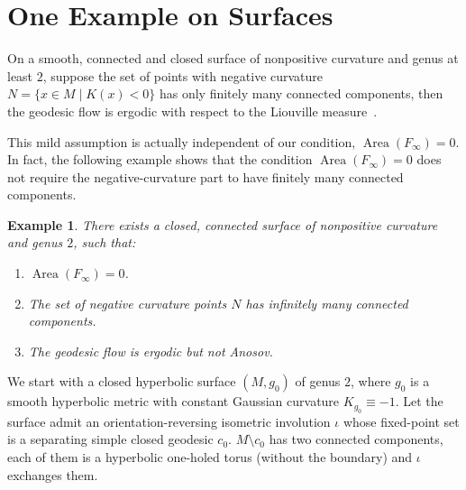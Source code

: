 \documentclass[reqno,11pt]{article}
\newtheorem{example}{Example}[section]
\theoremstyle{definition}
\theoremstyle{remark}
\numberwithin{equation}{section}
\DeclareMathOperator{\area}{Area}
\begin{document}
\section{One Example on Surfaces}\label{sec4}

On a smooth, connected and closed surface of nonpositive curvature and genus at least $2$, suppose the set of points with negative curvature $N=\{x\in M\mid K(x)<0\}$ has only finitely many connected components, then the geodesic flow is ergodic with respect to the Liouville measure~\cite{Wu2015,WuLiuWang2023}.

This mild assumption is actually independent of our condition, $\area(F_{\infty})=0$. In fact, the following example shows that the condition $\area(F_{\infty})=0$ does not require the negative-curvature part to have finitely many connected components.

\begin{example}
	There exists a closed, connected surface of nonpositive curvature and genus $2$, such that:
	\begin{enumerate}
		\item $\area(F_{\infty})=0$.
		\item The set of negative curvature points $N$ has infinitely many connected components.
		\item The geodesic flow is ergodic but not Anosov.
	\end{enumerate}
\end{example}

We start with a closed hyperbolic surface $(M,g_0)$ of genus $2$, where $g_{0}$ is a smooth hyperbolic metric with constant Gaussian curvature $K_{g_0}\equiv -1$. Let the surface admit an orientation-reversing isometric involution $\iota$ whose fixed-point set is a separating simple closed geodesic $c_{0}$. $M\setminus c_{0}$ has two connected components, each of them is a hyperbolic one-holed torus (without the boundary) and $\iota$ exchanges them.
\end{document}
